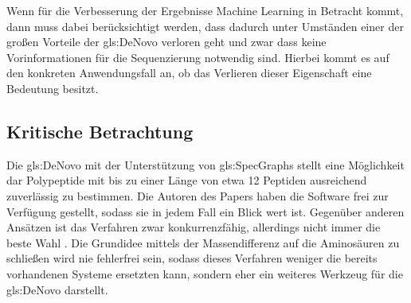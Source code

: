 \documentclass[a4paper, 12pt]{article}
\newcommand{\dashAndSpace}{\textendash \space}
\begin{document}
Wenn für die Verbesserung der Ergebnisse Machine Learning in Betracht kommt, dann muss dabei berücksichtigt werden, dass dadurch unter Umständen einer der großen Vorteile der \gls{gls:DeNovo} verloren geht \dashAndSpace und zwar dass keine Vorinformationen für die Sequenzierung notwendig sind. Hierbei kommt es auf den konkreten Anwendungsfall an, ob das Verlieren dieser Eigenschaft eine Bedeutung besitzt.

\subsection{Kritische Betrachtung}
Die \gls{gls:DeNovo} mit der Unterstützung von \glspl{gls:SpecGraph} stellt eine Möglichkeit dar Polypeptide mit bis zu einer Länge von etwa 12 Peptiden ausreichend zuverlässig zu bestimmen. Die Autoren des Papers \cite{OpenPNovo} haben die Software frei zur Verfügung gestellt, sodass sie in jedem Fall ein Blick wert ist.
Gegenüber anderen Ansätzen ist das Verfahren zwar konkurrenzfähig, allerdings nicht immer die beste Wahl \cite[650]{OpenPNovo}. Die Grundidee mittels der Massendifferenz auf die Aminosäuren zu schließen wird nie fehlerfrei sein, sodass dieses Verfahren weniger die bereits vorhandenen Systeme ersetzten kann, sondern eher ein weiteres Werkzeug für die \gls{gls:DeNovo} darstellt.

\begingroup
\setlength{\emergencystretch}{.5em}
\printbibliography
\endgroup
\end{document}
